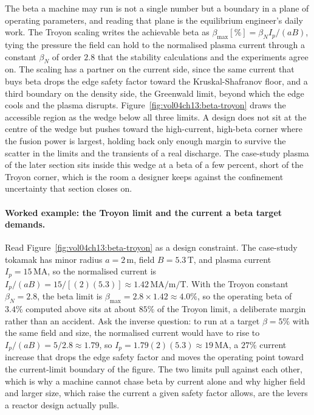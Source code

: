 The beta a machine may run is not a single number but a boundary in a plane
of operating parameters, and reading that plane is the equilibrium engineer's
daily work. The Troyon scaling writes the achievable beta as $\beta_{\max}
[\%] = \beta_N I_p/(aB)$, tying the pressure the field can hold to the
normalised plasma current through a constant $\beta_N$ of order $2.8$ that the
stability calculations and the experiments agree on. The scaling has a
partner on the current side, since the same current that buys beta drops the
edge safety factor toward the Kruskal-Shafranov floor, and a third boundary
on the density side, the Greenwald limit, beyond which the edge cools and the
plasma disrupts. Figure~\ref{fig:vol04ch13:beta-troyon} draws the accessible
region as the wedge below all three limits. A design does not sit at the
centre of the wedge but pushes toward the high-current, high-beta corner where
the fusion power is largest, holding back only enough margin to survive the
scatter in the limits and the transients of a real discharge. The case-study
plasma of the later section sits inside this wedge at a beta of a few percent,
short of the Troyon corner, which is the room a designer keeps against the
confinement uncertainty that section closes on.



\paragraph{Worked example: the Troyon limit and the current a beta target demands.}
Read Figure~\ref{fig:vol04ch13:beta-troyon} as a design constraint. The
case-study tokamak has minor radius $a = 2\,\si{\meter}$, field $B =
5.3\,\si{\tesla}$, and plasma current $I_p = 15\,\si{\mega\ampere}$, so the
normalised current is $I_p/(aB) = 15/[(2)(5.3)] \approx 1.42\,\si{\mega
\ampere}/\si{\meter}/\si{\tesla}$. With the Troyon constant $\beta_N = 2.8$,
the beta limit is $\beta_{\max} = 2.8\times 1.42 \approx 4.0\%$, so the
operating beta of $3.4\%$ computed above sits at about $85\%$ of the Troyon
limit, a deliberate margin rather than an accident. Ask the inverse question:
to run at a target $\beta = 5\%$ with the same field and size, the normalised
current would have to rise to $I_p/(aB) = 5/2.8 \approx 1.79$, so $I_p =
1.79(2)(5.3) \approx 19\,\si{\mega\ampere}$, a $27\%$ current increase that
drops the edge safety factor and moves the operating point toward the
current-limit boundary of the figure. The two limits pull against each other,
which is why a machine cannot chase beta by current alone and why higher field
and larger size, which raise the current a given safety factor allows, are the
levers a reactor design actually pulls.

